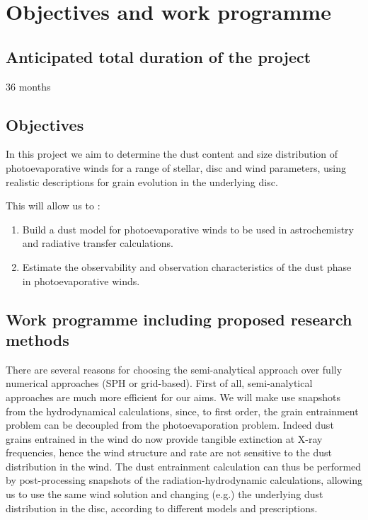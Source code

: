 \documentclass[10pt,fleqn,twoside]{article}
\begin{document}
\section{Objectives and work programme}
\renewcommand{\leftmark}{\sc Objectives and work programme}

\subsection{Anticipated total duration of the project}

36 months

\subsection{Objectives}
In this project
we aim to determine the dust content and size distribution of photoevaporative winds for a range of stellar, disc and wind parameters,
using realistic descriptions for grain evolution in the underlying
disc. 

This will allow us to : 
\begin{enumerate}
\item Build a dust model for photoevaporative winds to be used in
astrochemistry and radiative transfer calculations.
\item Estimate the observability and observation characteristics of
the dust phase in photoevaporative winds.
\end{enumerate}

\subsection{Work programme including proposed research methods}


There are several reasons for choosing the semi-analytical approach
over fully numerical approaches (SPH or grid-based). First of all,
semi-analytical 
approaches are much more efficient for our aims. We will make
use snapshots from the hydrodynamical calculations, since, to first
order, the grain entrainment problem can be decoupled from the photoevaporation 
problem. Indeed 
dust grains entrained in the wind do now provide tangible extinction
at X-ray frequencies, hence the wind structure and rate are
not sensitive to the dust distribution in the wind. The dust
entrainment calculation can thus be performed by
post-processing snapshots of the radiation-hydrodynamic calculations,
allowing us
to use the same wind solution and changing (e.g.) the underlying dust
distribution in the disc, according to different models and
prescriptions. 
\end{document}
